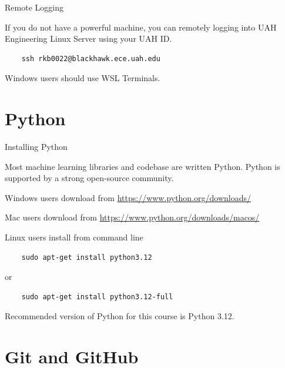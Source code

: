 \documentclass[aspectratio=169,xcolor=dvipsnames,svgnames,x11names,fleqn]{beamer}
\begin{document}
\begin{frame}[containsverbatim]{Remote Logging}
    
    If you do not have a powerful machine, you can remotely logging into UAH Engineering Linux Server using your UAH ID.

    \begin{verbatim}
    ssh rkb0022@blackhawk.ece.uah.edu
    \end{verbatim}

    Windows users should use WSL Terminals.

\end{frame}



\section{Python}

\begin{frame}
    \sectionpage
\end{frame}


\begin{frame}[containsverbatim]{Installing Python}
    
    Most machine learning libraries and codebase are written Python. Python is supported by a strong open-source community.

    Windows users download from \url{https://www.python.org/downloads/}

    Mac users download from \url{https://www.python.org/downloads/macos/}

    Linux users install from command line

    \begin{verbatim}
    sudo apt-get install python3.12
    \end{verbatim}

    or 

    \begin{verbatim}
    sudo apt-get install python3.12-full
    \end{verbatim}

    Recommended version of Python for this course is Python 3.12.

\end{frame}

\section{Git and GitHub}
\end{document}
